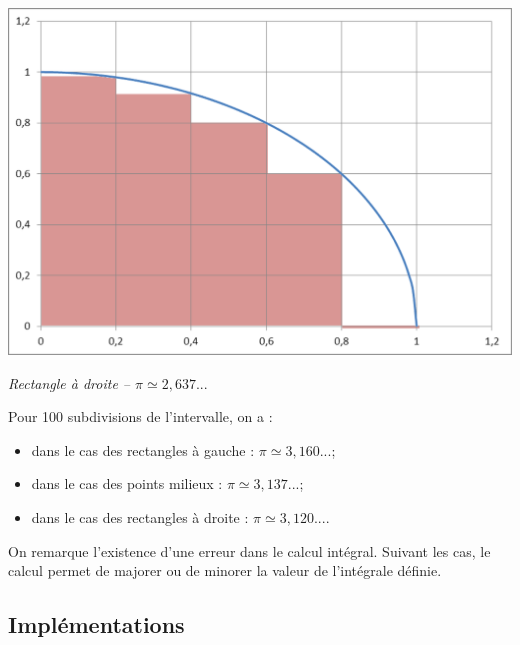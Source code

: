 \documentclass[11pt]{article}
\begin{document}
\begin{minipage}[c]{.32\linewidth}
\begin{center}
\includegraphics[width=.99\textwidth]{images/pi_5_d}

\textit{Rectangle à droite -- $\pi \simeq 2,637...$}
\end{center}
\end{minipage}

Pour 100 subdivisions de l'intervalle, on a :
\begin{itemize}
\item dans le cas des rectangles à gauche : $\pi\simeq 3,160...$;
\item dans le cas des points milieux : $\pi\simeq 3,137...$;
\item dans le cas des rectangles à droite : $\pi\simeq 3,120...$.
\end{itemize}


\begin{rem}
On remarque l'existence d'une erreur dans le calcul intégral. Suivant les cas, le calcul permet de majorer ou de minorer la valeur de l'intégrale définie. 
\end{rem}



\subsection{Implémentations}
\end{document}
